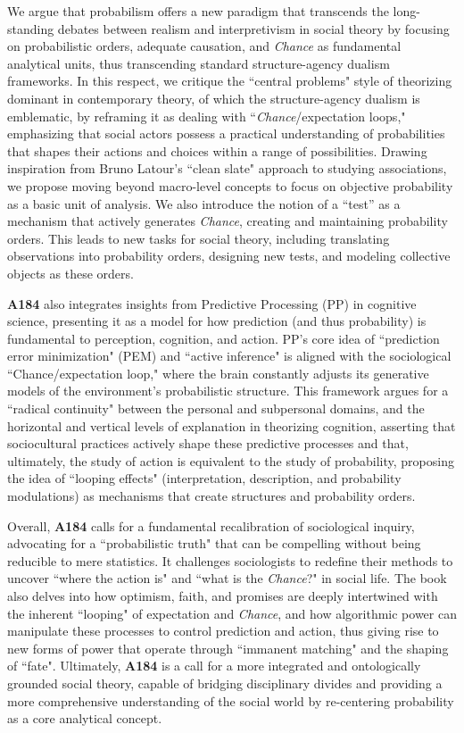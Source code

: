 \documentclass[a4paper,11pt]{extarticle}
\begin{document}
We argue that probabilism offers a new paradigm that transcends the long-standing debates between realism and interpretivism in social theory by focusing on probabilistic orders, adequate causation, and \textit{Chance} as fundamental analytical units, thus transcending standard structure-agency dualism frameworks. In this respect, we critique the ``central problems" style of theorizing dominant in contemporary theory, of which the structure-agency dualism is emblematic, by reframing it as dealing with ``\textit{Chance}/expectation loops," emphasizing that social actors possess a practical understanding of probabilities that shapes their actions and choices within a range of possibilities. Drawing inspiration from Bruno Latour's ``clean slate" approach to studying associations, we propose moving beyond macro-level concepts to focus on objective probability as a basic unit of analysis. We also introduce the notion of a ``test'' as a mechanism that actively generates \textit{Chance}, creating and maintaining probability orders. This leads to new tasks for social theory, including translating observations into probability orders, designing new tests, and modeling collective objects as these orders. 

\textbf{A184} also integrates insights from Predictive Processing (PP) in cognitive science, presenting it as a model for how prediction (and thus probability) is fundamental to perception, cognition, and action. PP's core idea of ``prediction error minimization" (PEM) and ``active inference" is aligned with the sociological ``Chance/expectation loop," where the brain constantly adjusts its generative models of the environment's probabilistic structure. This framework argues for a ``radical continuity" between the personal and subpersonal domains, and the horizontal and vertical levels of explanation in theorizing cognition, asserting that sociocultural practices actively shape these predictive processes and that, ultimately, the study of action is equivalent to the study of probability, proposing the idea of ``looping effects" (interpretation, description, and probability modulations) as mechanisms that create structures and probability orders.

Overall, \textbf{A184} calls for a fundamental recalibration of sociological inquiry, advocating for a ``probabilistic truth" that can be compelling without being reducible to mere statistics. It challenges sociologists to redefine their methods to uncover ``where the action is" and ``what is the \textit{Chance}?" in social life. The book also delves into how optimism, faith, and promises are deeply intertwined with the inherent ``looping" of expectation and \textit{Chance}, and how algorithmic power can manipulate these processes to control prediction and action, thus giving rise to new forms of power that operate through ``immanent matching" and the shaping of ``fate". Ultimately, \textbf{A184} is a call for a more integrated and ontologically grounded social theory, capable of bridging disciplinary divides and providing a more comprehensive understanding of the social world by re-centering probability as a core analytical concept.
\end{document}
